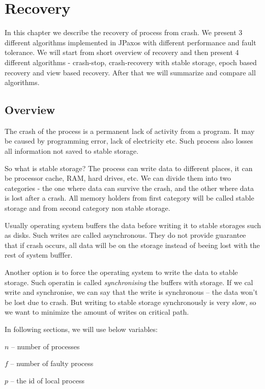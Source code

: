 \chapter{Recovery}

In this chapter we describe the recovery of process from crash. We present 3 different algorithms implemented in JPaxos with different performance and fault tolerance. We will start from short overview of recovery and then present 4 different algorithms - crash-stop, crash-recovery with stable storage, epoch based recovery and view based recovery. After that we will summarize and compare all algorithms.

\section{Overview}

The crash of the process is a permanent lack of activity from a program. It may be caused by programming error, lack of electricity etc. Such process also losses all information not saved to stable storage.

So what is stable storage? The process can write data to different places, it can be processor cache, RAM, hard drives, etc. We can divide them into two categories - the one where data can survive the crash, and the other where data is lost after a crash. All memory holders from first category will be called stable storage and from second category non stable storage.

Usually operating system buffers the data before writing it to stable storages such as disks. Such writes are called asynchronous. They do not provide guarantee that if crash occurs, all data will be on the storage instead of beeing lost with the rest of system bufffer.

Another option is to force the operating system to write the data to stable storage. Such operatin is called \emph{synchronising} the buffers with storage. If we cal write and synchronise, we can say that the write is synchronous -- the data won't be lost due to crash. But writing to stable storage synchronously is very slow, so we want to minimize the amount of writes on critical path.

In following sections, we will use below variables: 
\begin{tightList}
  \item[$n$] -- number of processes
  \item[$f$] -- number of faulty process
  \item[$p$] -- the id of local process
\end{tightList}

